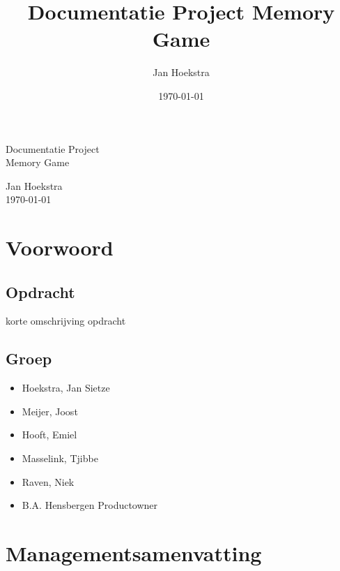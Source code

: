 \documentclass[a4paper,titlepage,11pt]{article}
\title{Documentatie Project Memory Game}
\date{\today}
\author{Jan Hoekstra}
\def\myauthor{Jan Hoekstra} %
\def\mycoauthor{} %
\def\mytitle{Documentatie Project} %
\def\mysubtitle{Memory Game}
\def\mydate{\today} %
\begin{document}

\begin{titlepage}
\vspace{5cm}

\centering
\vspace*{\fill}
\parbox[c][5cm][t]{10cm}{
  \color{white}\Huge\centering

  \mytitle \\
  \mysubtitle
  
  \vspace{3cm}
\huge
  \myauthor \\
  \mydate

}
\vspace*{\fill}

\end{titlepage}

\tableofcontents
{}

\section{Voorwoord}

\subsection{Opdracht}

korte omschrijving opdracht

\subsection{Groep}

\begin{itemize}
\item Hoekstra, Jan Sietze
\item Meijer, Joost
\item Hooft, Emiel
\item Masselink, Tjibbe
\item Raven, Niek
\item B.A. Hensbergen \- Productowner
\end{itemize}

\clearpage

\section{Managementsamenvatting}
\end{document}

